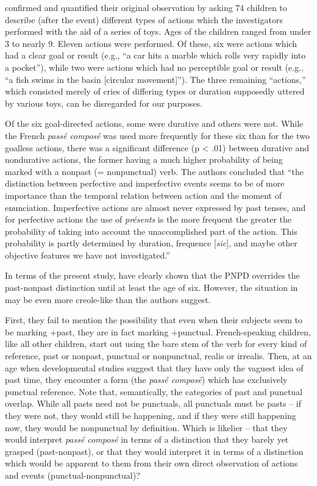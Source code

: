 \citeauthor{BrockartEtAl1973} confirmed and quantified their original observation by asking 74 children to describe (after the event) different types of actions which the investigators performed with the aid of a series of toys. Ages of the children ranged from under 3 to nearly 9. Eleven actions were performed. Of these, six were actions which had a clear goal or result (e.g., ``a car hits a marble which rolls very rapidly into a pocket''), while two were actions which had no perceptible goal or result (e.g., ``a fish swims in the basin [circular movement]''). The three remaining ``actions,'' which consisted merely of cries of differing types or duration supposedly uttered by various toys, can be disregarded for our purposes.

Of the six goal-directed actions, some were durative and others were not. While the French \textit{pass\'e compos\'e} was used more frequently for these six than for the two goalless actions, there was a significant difference (p {\textless} .01) between durative and nondurative actions, the former having a much higher probability of being marked with a nonpast (= nonpunctual) verb. The authors concluded that ``the distinction between perfective and imperfective events seems to be of more importance than the temporal relation between action and the moment of enunciation. Imperfective actions are almost never ex\-pressed by past tenses, and for perfective actions the use of \textit{pr\'esents} is the more frequent the greater the probability of taking into account the unaccomplished part of the action. This probability is partly determined by duration, frequence [\textit{sic}], and\enlargethispage{1\baselineskip} maybe other objective features we have not investigated.''


In terms of the present study, \citeauthor{BrockartEtAl1973} have clearly shown that the PNPD overrides the past-nonpast distinction until at least the age of six. However, the situation in  may be even more creole-like than the authors suggest.

First, they fail to mention the possibility that even when their subjects seem to be marking +past, they are in fact marking +punctual. French-speaking children, like all other children, start out using the bare stem of the verb for every kind of reference, past or nonpast, punctual or nonpunctual, realis or irrealis. Then, at an age when devel\-opmental studies suggest that they have only the vaguest idea of past time, they encounter a form (the \textit{pass\'e compos\'e}) which has exclusively punctual reference. Note that, semantically, the categories of past and punctual overlap. While all pasts need not be punctuals, all punctuals must be pasts -- if they were not, they would still be happening, and if they were still happening now, they would be nonpunctual by defini\-tion. Which is likelier -- that they would interpret \textit{pass\'e compos\'e} in terms of a distinction that they barely yet grasped (past-nonpast), or that they would interpret it in terms of a distinction which would be apparent to them from their own direct observation of actions and events (punctual-nonpunctual)?

